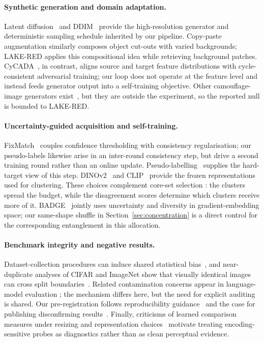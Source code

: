 \documentclass{article} %
\begin{document}
\paragraph{Synthetic generation and domain adaptation.}
Latent diffusion~\cite{rombach2022high} and DDIM~\cite{song2021denoising} provide the high-resolution
generator and deterministic sampling schedule inherited by our pipeline. Copy-paste augmentation
\cite{ghiasi2021simple} similarly composes object cut-outs with varied backgrounds; LAKE-RED applies
this compositional idea while retrieving background patches. CyCADA~\cite{hoffman2018cycada}, in
contrast, aligns source and target feature distributions with cycle-consistent adversarial training;
our loop does not operate at the feature level and instead feeds generator output into a
self-training objective. Other camouflage-image generators exist~\cite{chen2025realcamo}, but they
are outside the experiment, so the reported null is bounded to LAKE-RED.

\paragraph{Uncertainty-guided acquisition and self-training.}
FixMatch~\cite{sohn2020fixmatch} couples confidence thresholding with consistency regularisation;
our pseudo-labels likewise arise in an inter-round consistency step, but drive a second training
round rather than an online update. Pseudo-labelling~\cite{lee2013pseudo} supplies the hard-target
view of this step. DINOv2~\cite{oquab2024dinov2} and CLIP~\cite{radford2021learning} provide the
frozen representations used for clustering. These choices complement core-set selection
\cite{sener2018active}: the clusters spread the budget, while the disagreement scores determine
which clusters receive more of it. BADGE~\cite{ash2020deep} jointly uses uncertainty and diversity
in gradient-embedding space; our same-shape shuffle in Section~\ref{sec:concentration} is a direct
control for the corresponding entanglement in this allocation.

\paragraph{Benchmark integrity and negative results.}
Dataset-collection procedures can induce shared statistical bias~\cite{torralba2011unbiased}, and
near-duplicate analyses of CIFAR and ImageNet show that visually identical images can cross split
boundaries~\cite{barz2020train}. Related contamination concerns appear in language-model evaluation
\cite{wu2024antileak}; the mechanism differs here, but the need for explicit auditing is shared.
Our pre-registration follows reproducibility guidance~\cite{pineau2021improving} and the case for
publishing disconfirming results~\cite{karl2024position}. Finally, criticisms of learned comparison
measures under resizing and representation choices~\cite{parmar2022aliased,jayasumana2024rethinking}
motivate treating encoding-sensitive probes as diagnostics rather than as clean perceptual evidence.
\end{document}
